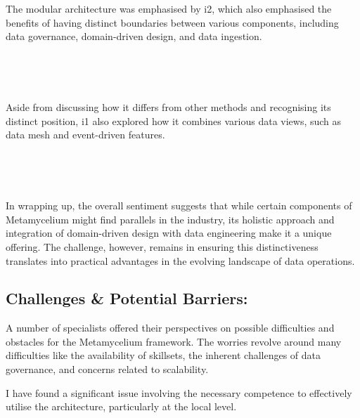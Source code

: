 \documentclass[journal]{IEEEtran}
\begin{document}
\,

\setlength{\fboxsep}{0.4em}
\noindent{}

\,

The modular architecture was emphasised by i2, which also emphasised the benefits of having distinct boundaries between various components, including data governance, domain-driven design, and data ingestion.


\,

\setlength{\fboxsep}{0.4em}
\noindent{}

\,

Aside from discussing how it differs from other methods and recognising its distinct position, i1 also explored how it combines various data views, such as data mesh and event-driven features.

\,

\setlength{\fboxsep}{0.4em}
\noindent{}

\,

In wrapping up, the overall sentiment suggests that while certain components of Metamycelium might find parallels in the industry, its holistic approach and integration of domain-driven design with data engineering make it a unique offering. The challenge, however, remains in ensuring this distinctiveness translates into practical advantages in the evolving landscape of data operations.

\subsection{Challenges \& Potential Barriers:}

A number of specialists offered their perspectives on possible difficulties and obstacles for the Metamycelium framework. The worries revolve around many difficulties like the availability of skillsets, the inherent challenges of data governance, and concerns related to scalability.

I have found a significant issue involving the necessary competence to effectively utilise the architecture, particularly at the local level.
\end{document}
